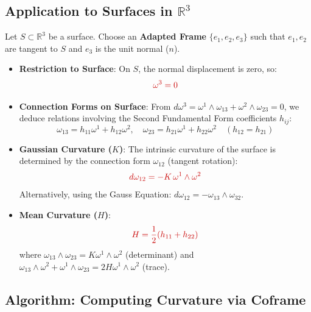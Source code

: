 \documentclass[a4paper,12pt]{article}
\newcommand{\key}[1]{\textcolor{keywordcolor}{\textbf{#1}}}
\newcommand{\formula}[1]{\textcolor{formulacolor}{#1}}
\begin{document}
\subsection{Application to Surfaces in $\mathbb{R}^3$}

Let $S \subset \mathbb{R}^3$ be a surface. Choose an \key{Adapted Frame} $\{e_1, e_2, e_3\}$ such that $e_1, e_2$ are tangent to $S$ and $e_3$ is the unit normal ($n$).

\begin{itemize}
    \item \key{Restriction to Surface}:
    On $S$, the normal displacement is zero, so:
    \begin{equation}
        \formula{\omega^3 = 0}
    \end{equation}
    
    \item \key{Connection Forms on Surface}:
    From $d\omega^3 = \omega^1 \wedge \omega_{13} + \omega^2 \wedge \omega_{23} = 0$, we deduce relations involving the Second Fundamental Form coefficients $h_{ij}$:
    \begin{equation}
        \omega_{13} = h_{11}\omega^1 + h_{12}\omega^2, \quad \omega_{23} = h_{21}\omega^1 + h_{22}\omega^2 \quad (h_{12}=h_{21})
    \end{equation}
    
    \item \key{Gaussian Curvature ($K$)}:
    The intrinsic curvature of the surface is determined by the connection form $\omega_{12}$ (tangent rotation):
    \begin{equation}
        \formula{d\omega_{12} = -K \, \omega^1 \wedge \omega^2}
    \end{equation}
    Alternatively, using the Gauss Equation: $d\omega_{12} = -\omega_{13} \wedge \omega_{32}$.
    
    \item \key{Mean Curvature ($H$)}:
    \begin{equation}
        \formula{H = \frac{1}{2}(h_{11} + h_{22})}
    \end{equation}
    where $\omega_{13} \wedge \omega_{23} = K \omega^1 \wedge \omega^2$ (determinant) and $\omega_{13} \wedge \omega^2 + \omega^1 \wedge \omega_{23} = 2H \omega^1 \wedge \omega^2$ (trace).
\end{itemize}

\subsection{Algorithm: Computing Curvature via Coframe}
\end{document}
